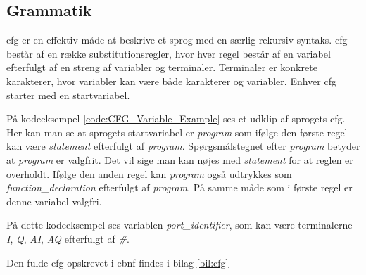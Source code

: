 \subsection{Grammatik}\label{sec:Gramatik}
\noindent \gls{cfg} er en effektiv måde at beskrive et sprog med en særlig rekursiv syntaks. \gls{cfg} består af en række substitutionsregler, hvor hver regel består af en variabel efterfulgt af en streng af variabler og terminaler. Terminaler er konkrete karakterer, hvor variabler kan være både karakterer og variabler. Enhver \gls{cfg} starter med en startvariabel.

På kodeeksempel \ref{code:CFG_Variable_Example} ses et udklip af sprogets \gls{cfg}. Her kan man se at sprogets startvariabel er \textit{program} som ifølge den første regel kan være \textit{statement} efterfulgt af \textit{program}. Spørgsmålstegnet efter \textit{program} betyder at \textit{program} er valgfrit. Det vil sige man kan nøjes med \textit{statement} for at reglen er overholdt. Ifølge den anden regel kan \textit{program} også udtrykkes som \textit{function\_declaration} efterfulgt af \textit{program}. På samme måde som i første regel er denne variabel valgfri.


\noindent På dette kodeeksempel ses variablen \textit{port\_identifier}, som kan være terminalerne \textit{I}, \textit{Q}, \textit{AI}, \textit{AQ} efterfulgt af \textit{\#}.

\noindent Den fulde \gls{cfg} opskrevet i \gls{ebnf} findes i bilag \ref{bil:cfg}
